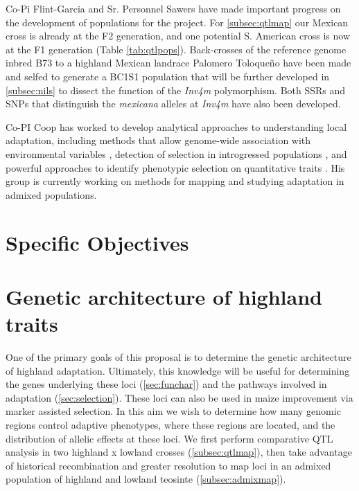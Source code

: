 Co-Pi Flint-Garcia and Sr. Personnel Sawers have made important progress on the development of populations for the project. For \ref{subsec:qtlmap} our Mexican  cross is already at the F2 generation, and one potential S. American cross is now at the F1 generation  (Table \ref{tab:qtlpops}).  Back-crosses of the reference genome inbred B73 to a highland Mexican landrace Palomero Toloque\~no have been made and selfed to generate a BC1S1 population that will be further developed in \ref{subsec:nils} to dissect the function of the \emph{Inv4m} polymorphism. Both SSRs and SNPs that distinguish the  \emph{mexicana} alleles at \emph{Inv4m} have also been developed.

Co-PI Coop has worked to develop analytical approaches to understanding local adaptation, including methods that allow genome-wide association with environmental variables \citep{Coop2010, gunther2013robust}, detection of selection in introgressed populations \citep{Brandvain2013}, and powerful approaches to identify phenotypic selection on quantitative traits \cite{Berg2013}.  His group is currently working on methods for mapping and studying adaptation in admixed populations.

\section*{Specific Objectives}


\renewcommand{\thesection}{Aim \arabic{section}}
\section{Genetic architecture of highland traits} \label{sec:qtl}

One of the primary goals of this proposal is to determine the genetic architecture of highland adaptation. Ultimately, this knowledge will be useful for determining the genes underlying these loci (\ref{sec:funchar}) and the pathways involved in adaptation (\ref{sec:selection}). These loci can also be used in maize improvement via marker assisted selection. In this aim we wish to determine how many genomic regions control adaptive phenotypes, where these regions are located, and the distribution of allelic effects at these loci. We first perform comparative QTL analysis in two highland x lowland crosses (\ref{subsec:qtlmap}), then take advantage of historical recombination and greater resolution to map loci in an admixed population of highland and lowland teosinte (\ref{subsec:admixmap}).

